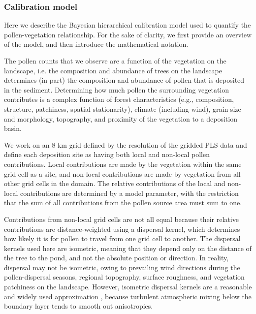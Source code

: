 \documentclass[12pt]{article}
\begin{document}

\subsubsection{Calibration model}
\label{sec:cal}

Here we describe the Bayesian hierarchical calibration model used to
quantify the pollen-vegetation relationship. For the sake of clarity,
we first provide an overview of the model, and then introduce the
mathematical notation.

The pollen counts that we observe are a function of the vegetation on
the landscape, i.e. the composition and abundance of trees on the
landscape determines (in part) the composition and abundance of pollen
that is deposited in the sediment. Determining how much pollen the
surrounding vegetation contributes is a complex function of forest
characteristics (e.g., composition, structure, patchiness, spatial
stationarity), climate (including wind), grain size and morphology,
topography, and proximity of the vegetation to a deposition basin.

We work on an 8 km grid defined by the resolution of the gridded PLS
data and define each deposition site as having both local and
non-local pollen contributions. Local contributions are made by the
vegetation within the same grid cell as a site, and non-local
contributions are made by vegetation from all other grid cells in the
domain. The relative contributions of the local and non-local
contributions are determined by a model parameter, with the
restriction that the sum of all contributions from the pollen source
area must sum to one.

Contributions from non-local grid cells are not all equal because
their relative contributions are distance-weighted using a dispersal
kernel, which determines how likely it is for pollen to travel from
one grid cell to another. The dispersal kernels used here are
isometric, meaning that they depend only on the distance of the tree
to the pond, and not the absolute position or direction. In reality,
dispersal may not be isometric, owing to prevailing wind directions
during the pollen-dispersal seasons, regional topography, surface
roughness, and vegetation patchiness on the landscape. However,
isometric dispersal kernels are a reasonable and widely used
approximation \citep{sugita2007theory1, sugita2007theory2}, because
turbulent atmospheric mixing below the boundary layer tends to smooth
out anisotropies.
\end{document}
